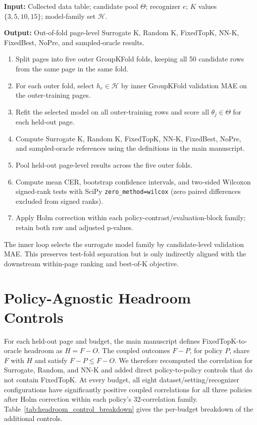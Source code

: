 \documentclass{article}
\begin{document}
\noindent\textbf{Input:} Collected data table; candidate pool \(\Theta\); recognizer \(e\); \(K\) values \(\{3,5,10,15\}\); model-family set \(\mathcal{H}\).

\noindent\textbf{Output:} Out-of-fold page-level Surrogate K, Random K, FixedTopK, NN-K, FixedBest, NoPre, and sampled-oracle results.

\begin{enumerate}
    \item Split pages into five outer GroupKFold folds, keeping all 50 candidate rows from the same page in the same fold.
    \item For each outer fold, select \(h_e \in \mathcal{H}\) by inner GroupKFold validation MAE on the outer-training pages.
    \item Refit the selected model on all outer-training rows and score all \(\theta_j\in\Theta\) for each held-out page.
    \item Compute Surrogate K, Random K, FixedTopK, NN-K, FixedBest, NoPre, and sampled-oracle references using the definitions in the main manuscript.
    \item Pool held-out page-level results across the five outer folds.
    \item Compute mean CER, bootstrap confidence intervals, and two-sided Wilcoxon signed-rank tests with SciPy \texttt{zero\_method=wilcox} (zero paired differences excluded from signed ranks).
    \item Apply Holm correction within each policy-contrast/evaluation-block family; retain both raw and adjusted p-values.
\end{enumerate}

The inner loop selects the surrogate model family by candidate-level validation MAE. This preserves test-fold separation but is only indirectly aligned with the downstream within-page ranking and best-of-K objective.

\section{Policy-Agnostic Headroom Controls}

For each held-out page and budget, the main manuscript defines FixedTopK-to-oracle headroom as \(H=F-O\). The coupled outcomes \(F-P\), for policy \(P\), share \(F\) with \(H\) and satisfy \(F-P\leq F-O\). We therefore recomputed the correlation for Surrogate, Random, and NN-K and added direct policy-to-policy controls that do not contain FixedTopK. At every budget, all eight dataset/setting/recognizer configurations have significantly positive coupled correlations for all three policies after Holm correction within each policy's 32-correlation family. Table~\ref{tab:headroom_control_breakdown} gives the per-budget breakdown of the additional controls.
\end{document}
